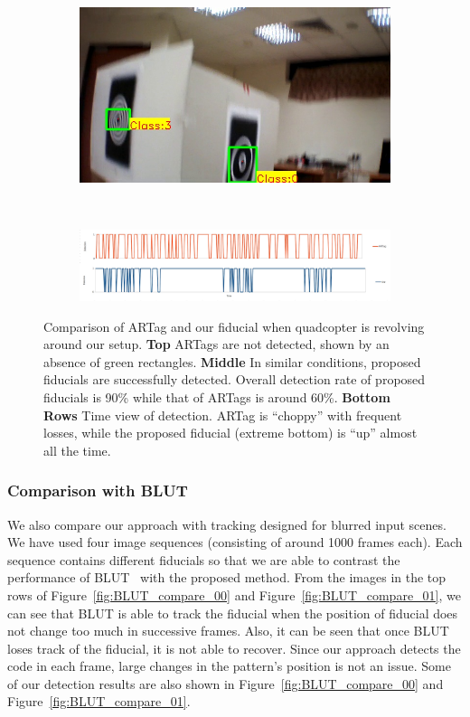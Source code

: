 \documentclass[10pt,twocolumn,letterpaper]{article}
\begin{document}
\begin{figure}
\begin{subfigure}[b]{.19\textwidth}
\end{subfigure}
\begin{subfigure}[b]{.19\textwidth}
\includegraphics[width=\linewidth]{images/setup_our/output_6/output_943.jpg}
\end{subfigure}\\
\begin{subfigure}[b]{\textwidth}
\includegraphics[width=\linewidth]{images/compare_detection.jpg}
\end{subfigure}
\caption{Comparison of ARTag and our fiducial when quadcopter is
  revolving around our setup. 
\textbf{Top} ARTags are not detected, shown by an absence of green rectangles. \textbf{Middle} In
similar conditions, proposed fiducials are successfully
detected. Overall detection rate of proposed
fiducials is 90\% while that of ARTags is around 60\%. 
\textbf{Bottom Rows} Time view of detection. ARTag is ``choppy'' with
frequent losses, while the proposed fiducial (extreme bottom) is
``up'' almost all the 
time.}
\label{fig:setup}
\end{figure}


\subsubsection{Comparison with BLUT}

We also compare our approach with tracking designed for blurred input
scenes.  We have used four image sequences (consisting of around 1000
frames each). Each sequence contains different fiducials so that we
are able to contrast the performance of BLUT~\cite{Wu:2011} with the
proposed method.  From the images in the top rows of
Figure~\ref{fig:BLUT_compare_00} and Figure~\ref{fig:BLUT_compare_01},
we can see that BLUT is able to track the fiducial when the position
of fiducial does not change too much in successive frames. Also, it
can be seen that once BLUT loses track of the fiducial, it is not
able to recover. Since our approach detects the code in each frame,
large changes in the pattern's position is not an issue.  Some of our
detection results are also shown in Figure~\ref{fig:BLUT_compare_00}
and Figure~\ref{fig:BLUT_compare_01}.
\end{document}
